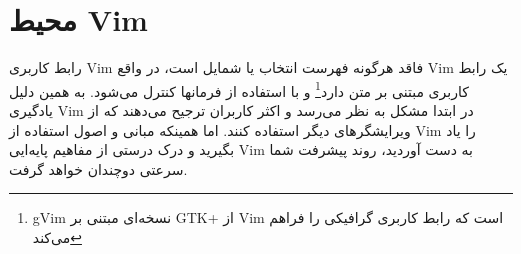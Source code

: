 \section{محیط Vim}
رابط کاربری Vim فاقد هرگونه فهرست انتخاب یا شمایل است، در واقع Vim یک رابط کاربری مبتنی بر متن دارد\footnote{gVim نسخه‌ای مبتنی بر GTK+ از Vim است که رابط کاربری گرافیکی را فراهم می‌کند} و با استفاده از فرمانها کنترل می‌شود. به همین دلیل یادگیری Vim در ابتدا مشکل به نظر می‌رسد و اکثر کاربران ترجیح می‌دهند که از ویرایشگرهای دیگر استفاده کنند. اما همینکه مبانی و اصول استفاده از Vim را یاد بگیرید و درک درستی از مفاهیم پا‌یه‌ایی Vim به دست آوردید، روند پیشرفت شما سرعتی دوچندان خواهد گرفت.


